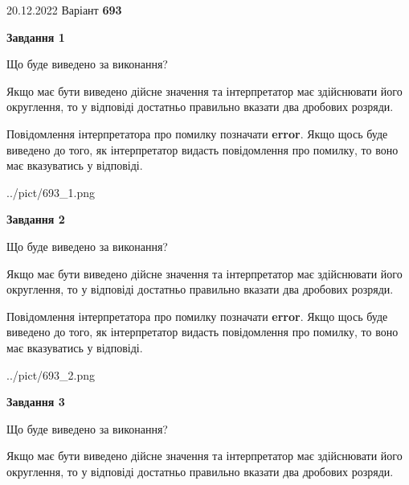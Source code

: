 \documentclass[12pt, ukrainian]{article}
\begin{document}
{20.12.2022 Варіант \No \textbf { 693 }\par}
{
\begin {Large}

{\begin {center}\textbf{Завдання 1}\end {center}}\par
Що буде виведено за виконання? \par

Якщо має бути виведено дійсне значення та інтерпретатор має здійснювати його округлення, 
то у відповіді достатньо правильно вказати два дробових розряди.

Повідомлення інтерпретатора про помилку позначати \textbf{error}.
Якщо щось буде виведено до того, як інтерпретатор видасть повідомлення про помилку, 
то воно має вказуватись у відповіді. \par

\begin{center}
	{../pict/693_1.png}
\end{center}
\newpage

{\begin {center}\textbf{Завдання 2}\end {center}}\par
Що буде виведено за виконання? \par

Якщо має бути виведено дійсне значення та інтерпретатор має здійснювати його округлення, 
то у відповіді достатньо правильно вказати два дробових розряди.

Повідомлення інтерпретатора про помилку позначати \textbf{error}.
Якщо щось буде виведено до того, як інтерпретатор видасть повідомлення про помилку, 
то воно має вказуватись у відповіді. \par

\begin{center}
	{../pict/693_2.png}
\end{center}
\newpage

{\begin {center}\textbf{Завдання 3}\end {center}}\par
Що буде виведено за виконання? \par

Якщо має бути виведено дійсне значення та інтерпретатор має здійснювати його округлення, 
то у відповіді достатньо правильно вказати два дробових розряди.


\end{Large}}
\end{document}
